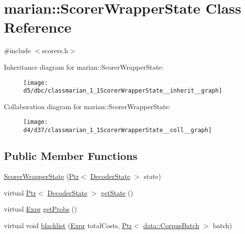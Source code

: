 \hypertarget{classmarian_1_1ScorerWrapperState}{}\section{marian\+:\+:Scorer\+Wrapper\+State Class Reference}
\label{classmarian_1_1ScorerWrapperState}


{\ttfamily \#include $<$scorers.\+h$>$}



Inheritance diagram for marian\+:\+:Scorer\+Wrapper\+State\+:
\nopagebreak
\begin{figure}[H]
\begin{center}
\leavevmode
\texttt{[image: d5/dbc/classmarian\_1\_1ScorerWrapperState\_\_inherit\_\_graph]}
\end{center}
\end{figure}


Collaboration diagram for marian\+:\+:Scorer\+Wrapper\+State\+:
\nopagebreak
\begin{figure}[H]
\begin{center}
\leavevmode
\texttt{[image: d4/d37/classmarian\_1\_1ScorerWrapperState\_\_coll\_\_graph]}
\end{center}
\end{figure}
\subsection*{Public Member Functions}
\begin{DoxyCompactItemize}
\item 
\hyperlink{classmarian_1_1ScorerWrapperState_af246fdb7fbf78a8cfafb2ab35d340770}{Scorer\+Wrapper\+State} (\hyperlink{namespacemarian_ad1a373be43a00ef9ce35666145137b08}{Ptr}$<$ \hyperlink{classmarian_1_1DecoderState}{Decoder\+State} $>$ state)
\item 
virtual \hyperlink{namespacemarian_ad1a373be43a00ef9ce35666145137b08}{Ptr}$<$ \hyperlink{classmarian_1_1DecoderState}{Decoder\+State} $>$ \hyperlink{classmarian_1_1ScorerWrapperState_a5e7c0dfa8c6d4675712d9da8473cb2e0}{get\+State} ()
\item 
virtual \hyperlink{namespacemarian_a498d8baf75b754011078b890b39c8e12}{Expr} \hyperlink{classmarian_1_1ScorerWrapperState_a10bbf53cf092a16916634183c728fdf2}{get\+Probs} ()
\item 
virtual void \hyperlink{classmarian_1_1ScorerWrapperState_a7a9b9e94ed1361444ddf3c1dfba69803}{blacklist} (\hyperlink{namespacemarian_a498d8baf75b754011078b890b39c8e12}{Expr} total\+Costs, \hyperlink{namespacemarian_ad1a373be43a00ef9ce35666145137b08}{Ptr}$<$ \hyperlink{classmarian_1_1data_1_1CorpusBatch}{data\+::\+Corpus\+Batch} $>$ batch)
\end{DoxyCompactItemize}
